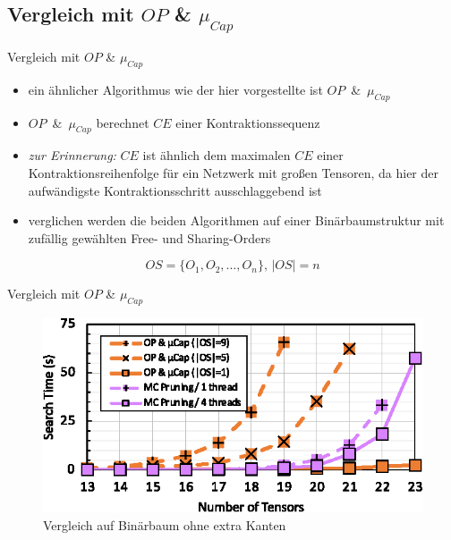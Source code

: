 \documentclass{beamer}
\begin{document}
\subsection{Vergleich mit $OP$ \& $\mu_{Cap}$}

\begin{frame}{Vergleich mit $OP$ \& $\mu_{Cap}$}
	\begin{itemize}
		\item ein ähnlicher Algorithmus wie der hier vorgestellte ist \mbox{$OP$ \& $\mu_{Cap}$}\cite{op_mu_cap}
		\item \mbox{$OP$ \& $\mu_{Cap}$} berechnet $CE$ einer Kontraktionssequenz
		\item \textit{zur Erinnerung:} $CE $ ist ähnlich dem maximalen $CE$ einer Kontraktionsreihenfolge für ein Netzwerk mit großen Tensoren, da hier der aufwändigste Kontraktionsschritt ausschlaggebend ist \pause
		\item verglichen werden die beiden Algorithmen auf einer Binärbaumstruktur mit zufällig gewählten Free- und Sharing-Orders
	\end{itemize}
	\begin{equation*}
		OS = \{O_1, O_2, \ldots, O_n\} \text{, } |OS| = n
	\end{equation*}
\end{frame}

\begin{frame}{Vergleich mit $OP$ \& $\mu_{Cap}$}
	\begin{figure}
		\includegraphics[scale=1.3]{figure_14_a}
		\caption*{Vergleich auf Binärbaum ohne extra Kanten}
	\end{figure}
\end{frame}
\end{document}
